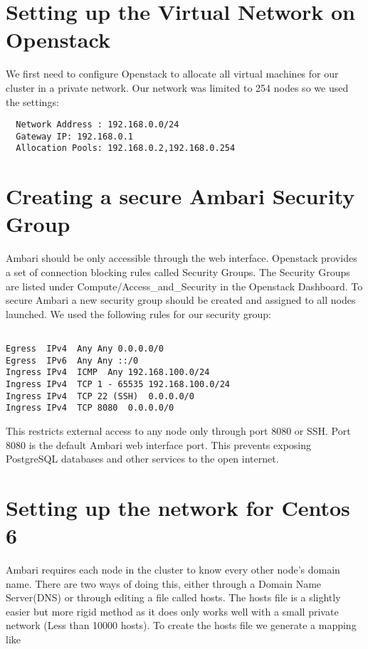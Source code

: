 \documentclass[9pt,twocolumn,twoside]{idsi}
\begin{document}
\section{Setting up the Virtual Network on Openstack}
We first need to configure Openstack to allocate all virtual machines for our cluster in a private network. Our network was limited to 254 nodes so we used the settings:

\begin{verbatim}
  Network Address : 192.168.0.0/24
  Gateway IP: 192.168.0.1
  Allocation Pools: 192.168.0.2,192.168.0.254
\end{verbatim}

\section{Creating a secure Ambari Security Group}
Ambari should be only accessible through the web interface. Openstack provides a set of connection blocking rules called Security Groups. The Security Groups are listed under Compute/Access\_and\_Security in the Openstack Dashboard. To secure Ambari a new security group should be created and assigned to all nodes launched. We used the following rules for our security group:

\begin{verbatim}

Egress  IPv4  Any Any 0.0.0.0/0
Egress  IPv6  Any Any ::/0 
Ingress IPv4  ICMP  Any 192.168.100.0/24 
Ingress IPv4  TCP 1 - 65535 192.168.100.0/24 
Ingress IPv4  TCP 22 (SSH)  0.0.0.0/0
Ingress IPv4  TCP 8080  0.0.0.0/0

\end{verbatim}

This restricts external access to any node only through port 8080 or SSH. Port 8080 is the default Ambari web interface port. This prevents exposing PostgreSQL databases and other services to the open internet. 

\section{Setting up the network for Centos 6}
\label{sec:network}

Ambari requires each node in the cluster to know every other node's domain name. There are two ways of doing this, either through a Domain Name Server(DNS) or through editing a file called hosts. The hosts file is a slightly easier but more rigid method as it does only works well with a small private network (Less than 10000 hosts). To create the hosts file we generate a mapping like
\end{document}
